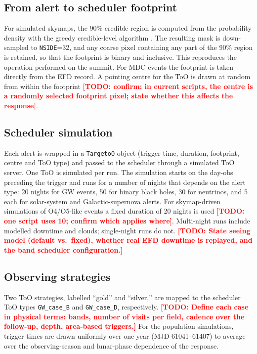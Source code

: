 \documentclass[OPS,lsstdraft,authoryear,toc]{lsstdoc}
\newcommand{\todo}[1]{\textcolor{red}{\textbf{[TODO: #1]}}}
\newcommand{\mdc}{MDC\xspace}
\begin{document}
\subsection{From alert to scheduler footprint}\label{sec:footprint}

For simulated skymaps, the 90\% credible region is computed from the probability density with the
greedy credible-level algorithm \citep[\texttt{ligo.skymap};][]{Singer2016}. The resulting
mask is down-sampled to \texttt{NSIDE}=32, and any coarse pixel containing any part of
the 90\% region is retained, so that the footprint is binary and inclusive. This reproduces the
operation performed on the summit. For \mdc{} events the footprint is taken
directly from the EFD record. A pointing centre for the ToO is drawn at random from within
the footprint \todo{confirm: in current scripts, the centre is a randomly selected footprint pixel; state whether this affects the response}.

\subsection{Scheduler simulation}\label{sec:sim}

Each alert is wrapped in a \texttt{TargetoO} object (trigger time, duration, footprint, centre and
ToO type) and passed to the scheduler through a simulated ToO server. One ToO is simulated
per run. The simulation starts on the day-obs preceding the trigger and runs for a number of nights that
depends on the alert type: 20 nights for GW events, 50 for binary black holes, 30 for neutrinos, and 5
each for solar-system and Galactic-supernova alerts. For skymap-driven simulations of
O4/O5-like events a fixed duration of 20 nights is used \todo{one script uses 10; confirm which applies where}.
Multi-night runs include modelled downtime and clouds; single-night runs do not.
\todo{State seeing model (default vs.\ fixed), whether real EFD downtime is replayed, and the band scheduler configuration.}

\subsection{Observing strategies}\label{sec:strategies}

Two ToO strategies, labelled ``gold'' and ``silver,'' are mapped to the scheduler ToO types
\texttt{GW\_case\_B} and \texttt{GW\_case\_D}, respectively. \todo{Define each case in physical terms: bands, number of visits per field, cadence over the follow-up, depth, area-based triggers.}
For the population simulations, trigger times are drawn uniformly over one year (MJD 61041--61407) to average over
the observing-season and lunar-phase dependence of the response.
\end{document}
